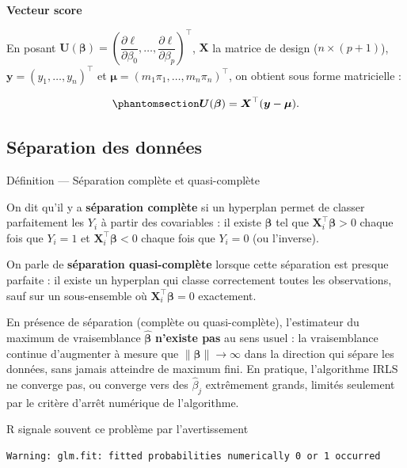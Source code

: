 \documentclass[
  french,
  letterpaper,
  DIV=11,
  numbers=noendperiod]{scrreprt}
\begin{document}
\textbf{Vecteur score}

En posant
\(\boldsymbol{U}(\boldsymbol{\beta}) = \left( \dfrac{\partial \ell}{\partial \beta_0}, \dots, \dfrac{\partial \ell}{\partial \beta_p} \right)^\top\),
\(\boldsymbol{X}\) la matrice de design (\(n \times (p+1)\)),
\(\boldsymbol{y} = (y_1, \dots, y_n)^\top\) et
\(\boldsymbol{\mu} = (m_1\pi_1, \dots, m_n\pi_n)^\top\), on obtient sous
forme matricielle :

\begin{equation}\protect\phantomsection\label{eq-score-vecteur}{
\boldsymbol{U}(\boldsymbol{\beta}) = \boldsymbol{X}^\top (\boldsymbol{y} - \boldsymbol{\mu}).
}\end{equation}

\subsection{Séparation des données}\label{sec-separation}

{Définition --- Séparation complète et quasi-complète}

On dit qu'il y a \textbf{séparation complète} si un hyperplan permet de
classer parfaitement les \(Y_i\) à partir des covariables : il existe
\(\boldsymbol\beta\) tel que
\(\boldsymbol{X}_i^\top\boldsymbol\beta > 0\) chaque fois que \(Y_i=1\)
et \(\boldsymbol{X}_i^\top\boldsymbol\beta < 0\) chaque fois que
\(Y_i=0\) (ou l'inverse).

On parle de \textbf{séparation quasi-complète} lorsque cette séparation
est presque parfaite : il existe un hyperplan qui classe correctement
toutes les observations, sauf sur un sous-ensemble où
\(\boldsymbol{X}_i^\top\boldsymbol\beta = 0\) exactement.

En présence de séparation (complète ou quasi-complète), l'estimateur du
maximum de vraisemblance \(\hat{\boldsymbol\beta}\) \textbf{n'existe
pas} au sens usuel : la vraisemblance continue d'augmenter à mesure que
\(\|\boldsymbol\beta\| \to \infty\) dans la direction qui sépare les
données, sans jamais atteindre de maximum fini. En pratique,
l'algorithme IRLS ne converge pas, ou converge vers des \(\hat\beta_j\)
extrêmement grands, limités seulement par le critère d'arrêt numérique
de l'algorithme.

R signale souvent ce problème par l'avertissement

\begin{verbatim}
Warning: glm.fit: fitted probabilities numerically 0 or 1 occurred
\end{verbatim}
\end{document}
